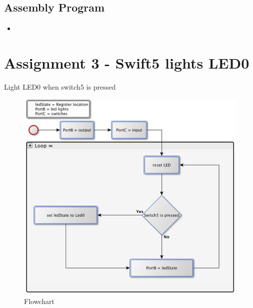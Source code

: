 \documentclass[a4paper, 12pt]{article}
\newcommand{\avrasm}[2]{
\begin{itemize}
\item[]
\end{itemize}
}
\begin{document}

\newpage

\subsection{Assembly Program}
\avrasm{../src/a2.asm}{}
\newpage

\section{Assignment 3 - Swift5 lights LED0}



\begin{algorithm}
\begin{algorithmic}
\Repeat
{} 
\EndIf
{}
\Until{$\infty$}
\EndProcedure
\caption{Light LED0 when switch5 is pressed}
\label{assign2.pseudo}
\end{algorithmic}
\end{algorithm}

\begin{figure}[h]
\includegraphics[scale=0.5]{Flowchart_pics/assignment3_pic.png} 
\caption{Flowchart}
\label{}
\end{figure}
\end{document}

